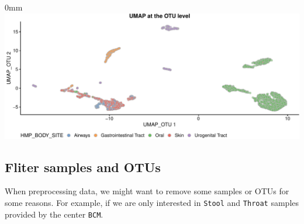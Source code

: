 \documentclass[]{article}
\newcommand{\hlnum}[1]{\textcolor[rgb]{0.816,0.125,0.439}{#1}}%
\newcommand{\hlstr}[1]{\textcolor[rgb]{0.251,0.627,0.251}{#1}}%
\newcommand{\hlopt}[1]{\textcolor[rgb]{0,0,0}{#1}}%
\newcommand{\hlstd}[1]{\textcolor[rgb]{0.251,0.251,0.251}{#1}}%
\newcommand{\hlkwc}[1]{\textcolor[rgb]{0.251,0.251,0.251}{#1}}%
\newcommand{\hlkwd}[1]{\textcolor[rgb]{0.878,0.439,0.125}{#1}}%
\newenvironment{Shaded}{\begin{myshaded}}{\end{myshaded}}
\newcommand{\KeywordTok}[1]{\hlkwd{#1}}
\newcommand{\DataTypeTok}[1]{\hlkwc{#1}}
\newcommand{\DecValTok}[1]{\hlnum{#1}}
\newcommand{\StringTok}[1]{\hlstr{#1}}
\newcommand{\OperatorTok}[1]{\hlopt{#1}}
\newcommand{\NormalTok}[1]{\hlstd{#1}}
\begin{document}
\begin{adjustwidth}{\fltoffset}{0mm}
\includegraphics{figure/unnamed-chunk-62-1} \end{adjustwidth}

\hypertarget{fliter-samples-and-otus}{%
\subsection{Fliter samples and OTUs}\label{fliter-samples-and-otus}}

When preprocessing data, we might want to remove some samples or OTUs for some reasons. For example, if we are only interested in \texttt{Stool} and \texttt{Throat} samples provided by the center \texttt{BCM}.

\begin{Shaded}
\end{Shaded}
\end{document}
